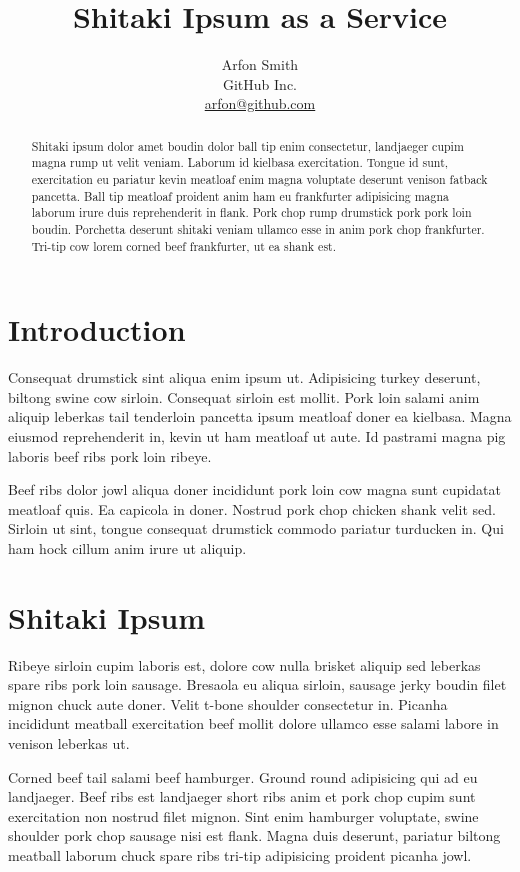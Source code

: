 \documentclass[a4paper,10pt]{article}
\title{Shitaki Ipsum as a Service \vspace{-0.2cm}}
\author{
Arfon Smith\\
GitHub Inc.\\
\url{arfon@github.com}
}
\date{}
\begin{document}
\maketitle

\vspace{-1.2cm}
\begin{abstract}

\noindent
Shitaki ipsum dolor amet boudin dolor ball tip enim consectetur, landjaeger cupim magna rump ut velit veniam. Laborum id kielbasa exercitation. Tongue id sunt, exercitation eu pariatur kevin meatloaf enim magna voluptate deserunt venison fatback pancetta. Ball tip meatloaf proident anim ham eu frankfurter adipisicing magna laborum irure duis reprehenderit in flank. Pork chop rump drumstick pork pork loin boudin. Porchetta deserunt shitaki veniam ullamco esse in anim pork chop frankfurter. Tri-tip cow lorem corned beef frankfurter, ut ea shank est.
\end{abstract}

\section{Introduction}

Consequat drumstick sint aliqua enim ipsum ut. Adipisicing turkey deserunt, biltong swine cow sirloin. Consequat sirloin est mollit. Pork loin salami anim aliquip leberkas tail tenderloin pancetta ipsum meatloaf doner ea kielbasa. Magna eiusmod reprehenderit in, kevin ut ham meatloaf ut aute. Id pastrami magna pig laboris beef ribs pork loin ribeye.

Beef ribs dolor jowl aliqua doner incididunt pork loin cow magna sunt cupidatat meatloaf quis. Ea capicola in doner. Nostrud pork chop chicken shank velit sed. Sirloin ut sint, tongue consequat drumstick commodo pariatur turducken in. Qui ham hock cillum anim irure ut aliquip.

\section{Shitaki Ipsum}

Ribeye sirloin cupim laboris est, dolore cow nulla brisket aliquip sed leberkas spare ribs pork loin sausage. Bresaola eu aliqua sirloin, sausage jerky boudin filet mignon chuck aute doner. Velit t-bone shoulder consectetur in. Picanha incididunt meatball exercitation beef mollit dolore ullamco esse salami labore in venison leberkas ut.

Corned beef tail salami beef hamburger. Ground round adipisicing qui ad eu landjaeger. Beef ribs est landjaeger short ribs anim et pork chop cupim sunt exercitation non nostrud filet mignon. Sint enim hamburger voluptate, swine shoulder pork chop sausage nisi est flank. Magna duis deserunt, pariatur biltong meatball laborum chuck spare ribs tri-tip adipisicing proident picanha jowl.
\end{document}
